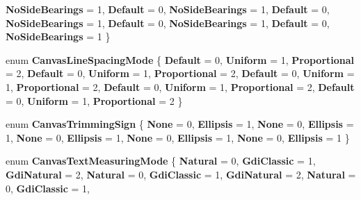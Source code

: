 \begin{DoxyCompactItemize}
{\bfseries No\+Side\+Bearings} = 1, 
{\bfseries Default} = 0, 
{\bfseries No\+Side\+Bearings} = 1, 
\newline
{\bfseries Default} = 0, 
{\bfseries No\+Side\+Bearings} = 1, 
{\bfseries Default} = 0, 
{\bfseries No\+Side\+Bearings} = 1, 
\newline
{\bfseries Default} = 0, 
{\bfseries No\+Side\+Bearings} = 1
 \}
\item 
\mbox{\label{namespace_microsoft_1_1_graphics_1_1_canvas_1_1_text_a0af1601f34ce8114935e99af136dc8cc}} 
enum {\bfseries Canvas\+Line\+Spacing\+Mode} \{ \newline
{\bfseries Default} = 0, 
{\bfseries Uniform} = 1, 
{\bfseries Proportional} = 2, 
{\bfseries Default} = 0, 
\newline
{\bfseries Uniform} = 1, 
{\bfseries Proportional} = 2, 
{\bfseries Default} = 0, 
{\bfseries Uniform} = 1, 
\newline
{\bfseries Proportional} = 2, 
{\bfseries Default} = 0, 
{\bfseries Uniform} = 1, 
{\bfseries Proportional} = 2, 
\newline
{\bfseries Default} = 0, 
{\bfseries Uniform} = 1, 
{\bfseries Proportional} = 2
 \}
\item 
\mbox{\label{namespace_microsoft_1_1_graphics_1_1_canvas_1_1_text_a891e2d3429f4e8717d79bdd171ed64a0}} 
enum {\bfseries Canvas\+Trimming\+Sign} \{ \newline
{\bfseries None} = 0, 
{\bfseries Ellipsis} = 1, 
{\bfseries None} = 0, 
{\bfseries Ellipsis} = 1, 
\newline
{\bfseries None} = 0, 
{\bfseries Ellipsis} = 1, 
{\bfseries None} = 0, 
{\bfseries Ellipsis} = 1, 
\newline
{\bfseries None} = 0, 
{\bfseries Ellipsis} = 1
 \}
\item 
\mbox{\label{namespace_microsoft_1_1_graphics_1_1_canvas_1_1_text_a3496181b6d55fc9dc4eeaff916dc841f}} 
enum {\bfseries Canvas\+Text\+Measuring\+Mode} \{ \newline
{\bfseries Natural} = 0, 
{\bfseries Gdi\+Classic} = 1, 
{\bfseries Gdi\+Natural} = 2, 
{\bfseries Natural} = 0, 
\newline
{\bfseries Gdi\+Classic} = 1, 
{\bfseries Gdi\+Natural} = 2, 
{\bfseries Natural} = 0, 
{\bfseries Gdi\+Classic} = 1, 

\end{DoxyCompactItemize}
